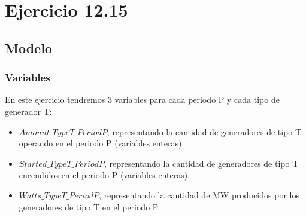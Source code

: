 \section{Ejercicio 12.15}
\subsection{Modelo}
\subsubsection{Variables}
En este ejercicio tendremos 3 variables para cada periodo P y cada tipo de generador T:
\begin{itemize}
\item $Amount\_TypeT\_PeriodP$, representando la cantidad de generadores de tipo T operando en el periodo P (variables enteras).
\item $Started\_TypeT\_PeriodP$, representando la cantidad de generadores de tipo T encendidos en el periodo P (variables enteras).
\item $Watts\_TypeT\_PeriodP$, representando la cantidad de MW producidos por los generadores de tipo T en el periodo P.
\end{itemize}
